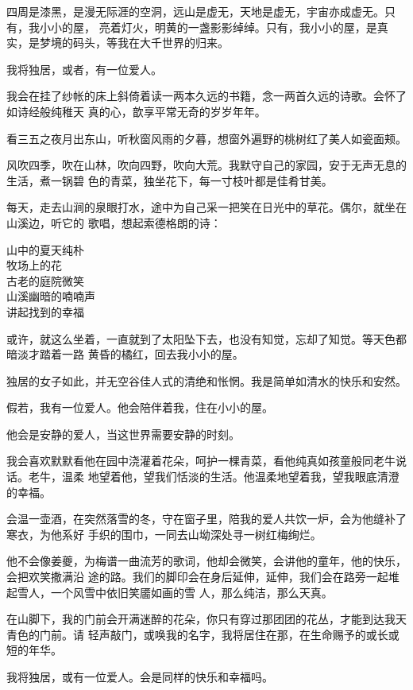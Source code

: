 		四周是漆黑，是漫无际涯的空洞，远山是虚无，天地是虚无，宇宙亦成虚无。只有，我小小的屋，
	亮着灯火，明黄的一盏影影绰绰。只有，我小小的屋，是真实，是梦境的码头，等我在大千世界的归来。

		我将独居，或者，有一位爱人。

		我会在挂了纱帐的床上斜倚着读一两本久远的书籍，念一两首久远的诗歌。会怀了如诗经般纯稚天
	真的心，歆享平常无奇的岁岁年年。

		看三五之夜月出东山，听秋窗风雨的夕暮，想窗外遍野的桃树红了美人如瓷面颊。

		风吹四季，吹在山林，吹向四野，吹向大荒。我默守自己的家园，安于无声无息的生活，煮一锅碧
	色的青菜，独坐花下，每一寸枝叶都是佳肴甘美。

		每天，走去山涧的泉眼打水，途中为自己采一把笑在日光中的草花。偶尔，就坐在山溪边，听它的
	歌唱，想起索德格朗的诗：

		\longpoem{}{}{}
			山中的夏天纯朴 \\
			牧场上的花 \\
			古老的庭院微笑 \\
			山溪幽暗的喃喃声 \\
			讲起找到的幸福
		\endlongpoem

		或许，就这么坐着，一直就到了太阳坠下去，也没有知觉，忘却了知觉。等天色都暗淡才踏着一路
	黄昏的橘红，回去我小小的屋。

		独居的女子如此，并无空谷佳人式的清绝和怅惘。我是简单如清水的快乐和安然。

		假若，我有一位爱人。他会陪伴着我，住在小小的屋。\par
		他会是安静的爱人，当这世界需要安静的时刻。

		我会喜欢默默看他在园中浇灌着花朵，呵护一棵青菜，看他纯真如孩童般同老牛说话。老牛，温柔
	地望着他，望我们恬淡的生活。他温柔地望着我，望我眼底清澄的幸福。

		会温一壶酒，在突然落雪的冬，守在窗子里，陪我的爱人共饮一炉，会为他缝补了寒衣，为他系好
	手织的围巾，一同去山坳深处寻一树红梅绚烂。

		他不会像姜夔，为梅谱一曲流芳的歌词，他却会微笑，会讲他的童年，他的快乐，会把欢笑撒满沿
	途的路。我们的脚印会在身后延伸，延伸，我们会在路旁一起堆起雪人，一个风雪中依旧笑靥如画的雪
	人，那么纯洁，那么天真。

		在山脚下，我的门前会开满迷醉的花朵，你只有穿过那团团的花丛，才能到达我天青色的门前。请
	轻声敲门，或唤我的名字，我将居住在那，在生命赐予的或长或短的年华。

		我将独居，或有一位爱人。会是同样的快乐和幸福吗。

